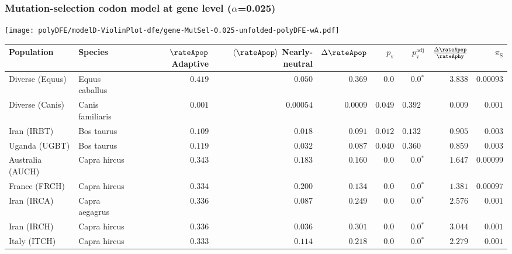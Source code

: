 \subsubsection*{Mutation-selection codon model at gene level ($\alpha$=0.025)}
\begin{center}
    \texttt{[image: polyDFE/modelD-ViolinPlot-dfe/gene-MutSel-0.025-unfolded-polyDFE-wA.pdf]}
    \begin{adjustbox}{width = 1\textwidth}
        \begin{tabular}{|l|l|r|r|r|r|r|r|r|}
            \toprule
            Population & Species & \specialcell{$\rateApop$ \\ Adaptive}                & \specialcell{$\left< \rateApop \right>$ \\ Nearly-neutral}                & $\Delta \rateApop $    & $p_{\mathrm{v}}$ & $p_{\mathrm{v}}^{\mathrm{adj}}$ & $\frac{\Delta\rateApop}{\rateAphy}$ & $\pi_{\textrm{S}}$ \\
            \midrule
            Diverse (Equus)                    & Equus caballus          & $ 0.419$ & $ 0.050$  & $ 0.369$ & $0.0$ & $\bm{0.0{^*}}$     & $ 3.838$ & $0.00093$  \\
            Diverse (Canis)                  & Canis familiaris          & $ 0.001$ & $0.00054$  & $0.0009$ & $ 0.049$ & $ 0.392~~$     & $ 0.009$ & $ 0.001$ \\
            Iran (IRBT)               & Bos taurus        & $ 0.109$ & $ 0.018$  & $ 0.091$ & $ 0.012$    & $ 0.132~~$ & $ 0.905$ & $ 0.003$ \\
            Uganda (UGBT)                  & Bos taurus        & $ 0.119$ & $ 0.032$  & $ 0.087$ & $ 0.040$    & $ 0.360~~$ & $ 0.859$ & $ 0.003$ \\
            Australia (AUCH)                    & Capra hircus      & $ 0.343$ & $ 0.183$  & $ 0.160$ & $0.0$    & $\bm{0.0{^*}}$ & $ 1.647$ & $0.00099$ \\
            France (FRCH)                    & Capra hircus        & $ 0.334$ & $ 0.200$  & $ 0.134$ & $0.0$    & $\bm{0.0{^*}}$ & $ 1.381$ & $0.00097$ \\
            Iran (IRCA)                   & Capra aegagrus        & $ 0.336$ & $ 0.087$  & $ 0.249$ & $0.0$    & $\bm{0.0{^*}}$ & $ 2.576$ & $ 0.001$ \\
            Iran (IRCH)                 & Capra hircus        & $ 0.336$ & $ 0.036$  & $ 0.301$ & $0.0$    & $\bm{0.0{^*}}$ & $ 3.044$ & $ 0.001$ \\
            Italy (ITCH)                    & Capra hircus          & $ 0.333$ & $ 0.114$  & $ 0.218$ & $0.0$ & $\bm{0.0{^*}}$     & $ 2.279$ & $ 0.001$  \\

\end{tabular}
\end{adjustbox}
\end{center}

